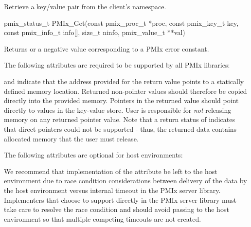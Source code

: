 Retrieve a key/value pair from the client's namespace.

\format

\cspecificstart
\begin{codepar}
pmix_status_t
PMIx_Get(const pmix_proc_t *proc, const pmix_key_t key,
         const pmix_info_t info[], size_t ninfo,
         pmix_value_t **val)
\end{codepar}
\cspecificend

\begin{arglist}
\end{arglist}

Returns  or a negative value corresponding to a PMIx error constant.

\reqattrstart
The following attributes are required to be supported by all \ac{PMIx} libraries:

and indicate that the address provided for the return value points to a statically defined memory location. Returned non-pointer values should therefore be copied directly into the provided memory. Pointers in the returned value should point directly to values in the key-value store. User is responsible for \emph{not} releasing memory on any returned pointer value. Note that a return status of  indicates that direct pointers could not be supported - thus, the returned data contains allocated memory that the user must release.
\pasteAttributeItemEnd

\reqattrend

\optattrstart
The following attributes are optional for host environments:


\optattrend

\adviceimplstart
We recommend that implementation of the  attribute be left to the host environment due to race condition considerations between delivery of the data by the host environment versus internal timeout in the \ac{PMIx} server library. Implementers that choose to support  directly in the \ac{PMIx} server library must take care to resolve the race condition and should avoid passing  to the host environment so that multiple competing timeouts are not created.
\adviceimplend

